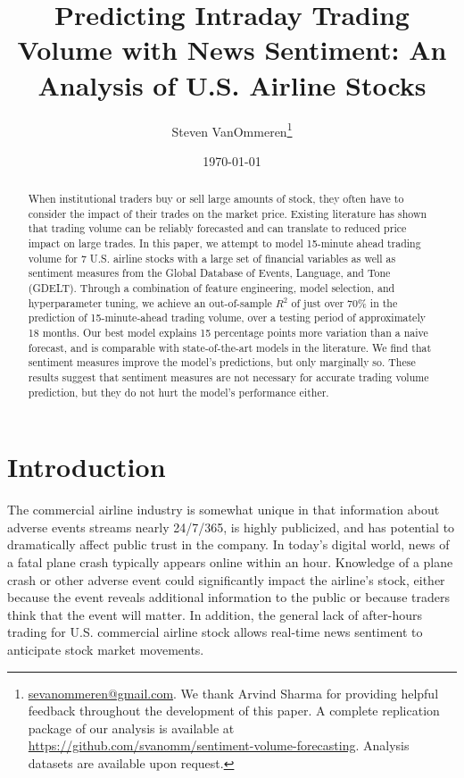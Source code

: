 \documentclass[12pt]{article}
\begin{document}
\title{Predicting Intraday Trading Volume with News Sentiment: An Analysis of U.S. Airline Stocks}
\author{Steven VanOmmeren\thanks{\href{mailto:sevanommeren@gmail.com}{sevanommeren@gmail.com}. We thank Arvind Sharma for providing helpful feedback throughout the development of this paper. A complete replication package of our analysis is available at \url{https://github.com/svanomm/sentiment-volume-forecasting}. Analysis datasets are available upon request.}}
\date{\today}
\maketitle
\begin{abstract}
\noindent
    When institutional traders buy or sell large amounts of stock, they often have to consider the impact of their trades on the market price. Existing literature has shown that trading volume can be reliably forecasted and can translate to reduced price impact on large trades. In this paper, we attempt to model 15-minute ahead trading volume for 7 U.S. airline stocks with a large set of financial variables as well as sentiment measures from the Global Database of Events, Language, and Tone (GDELT). Through a combination of feature engineering, model selection, and hyperparameter tuning, we achieve an out-of-sample $R^2$ of just over 70\% in the prediction of 15-minute-ahead trading volume, over a testing period of approximately 18 months. Our best model explains 15 percentage points more variation than a naive forecast, and is comparable with state-of-the-art models in the literature. We find that sentiment measures improve the model's predictions, but only marginally so. These results suggest that sentiment measures are not necessary for accurate trading volume prediction, but they do not hurt the model's performance either. 
\end{abstract}
\newpage
\tableofcontents
\newpage

\doublespacing
\section{Introduction}
The commercial airline industry is somewhat unique in that information about adverse events streams nearly 24/7/365, is highly publicized, and has potential to dramatically affect public trust in the company. In today's digital world, news of a fatal plane crash typically appears online within an hour. Knowledge of a plane crash or other adverse event could significantly impact the airline's stock, either because the event reveals additional information to the public or because traders think that the event will matter. In addition, the general lack of after-hours trading for U.S. commercial airline stock allows real-time news sentiment to anticipate stock market movements.
\end{document}
